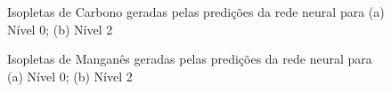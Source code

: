 \documentclass[brazil,tf,epusp]{usp}  %
\begin{document}
\begin{figure}
\caption{Isopletas de Carbono geradas pelas predições da rede neural para (a) Nível 0; (b) Nível 2 }
\label{fig:C_NN_isop}
\end{figure}

\begin{figure}
\caption{Isopletas de Manganês geradas pelas predições da rede neural para (a) Nível 0; (b) Nível 2 }
\label{fig:Mn_NN_isop}
\end{figure}
\end{document}

